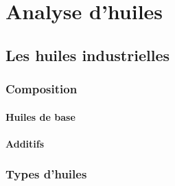 

\begin{comment}

\documentclass[a4paper, 11pt, twoside, fleqn]{memoir}

\usepackage{AOCDTF-cnam}

\marqueurchapitre




	\openleft %

\end{comment}

\chapter{Analyse d'huiles}
\ChapFrame

\section{Les huiles industrielles}


\subsection{Composition}

\subsubsection{Huiles de base}

\subsubsection{Additifs}


\subsection{Types d'huiles}

